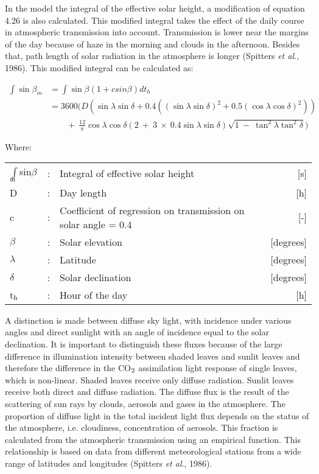 In the model the integral of the effective solar height, a modification of equation 4.26 is
also calculated. This modified integral takes the effect of the daily course in atmos\-pheric
transmis\-sion into account. Transmission is lower near the margins of the day because of
haze in the morning and clouds in the afternoon. Besides that, path length of solar
radiation in the atmosphere is longer (Spitters {\it et al\/}., 1986). This modified integral can be calculated as:

\begin{align}
\int \sin \beta_{m} &= \int \sin \beta (1+csin \beta ) dt _{h}  \\
                    &=3600(D ( \sin \lambda \sin \delta + 0.4 
                      (( \sin \lambda \sin \delta )^{2} + 0.5( 
                      \cos \lambda \cos \delta ) ^{2} ))  \nonumber \\
                      &\qquad {} +~{\frac{12}{\pi }} \cos \lambda \cos 
                      \delta (2~+~3 ~\times ~ 0.4 \sin \lambda \sin \delta ) 
                      \sqrt{1~-~\tan^{2} \lambda \tan^{2} \delta } ) \nonumber
\end{align}


Where:\\
\begin{tabularx}{\textwidth}{llXr}
$\int$sin$\beta$$_{{\rm m}}$  &:& Integral of effective solar height       & [s]\\
D  &:& Day length       & [h]\\
c  &:& Coefficient of regression on transmission on solar angle = 0.4       & [-]\\
$\beta$  &:& Solar elevation        & [degrees]\\
$\lambda$  &:& Latitude       & [degrees]\\
$\delta$  &:& Solar declination       & [degrees]\\
t$_{{\rm h}}$  &:& Hour of the day       & [h]\\
\end{tabularx}

A distinction is made between diffuse sky light, with incidence under various angles and
direct sunlight with an angle of incidence equal to the solar declination. It is important to distin\-guish these fluxes because of the large difference in illumination intensity between shaded leaves and sunlit leaves and therefore the difference in the CO$_{{\rm 2}}$ assimila\-tion light response of single leaves, which is non-linear. Shaded leaves receive only diffuse radiation. Sunlit leaves receive both direct and diffuse radiation. The diffuse flux is the result of the scattering of sun rays by clouds, aerosols and gases in the atmo\-sphere. The propor\-tion of diffuse light in the total incident light flux depends on the status of the atmosphere, i.e. cloudi\-ness, concentra\-tion of aerosols. This fraction is calculated from the atmospheric transmis\-sion using an empirical function. This relationship is based on data from different meteorologi\-cal stations from a wide range of latitudes and longitudes (Spitters {\it et al\/}., 1986). 

